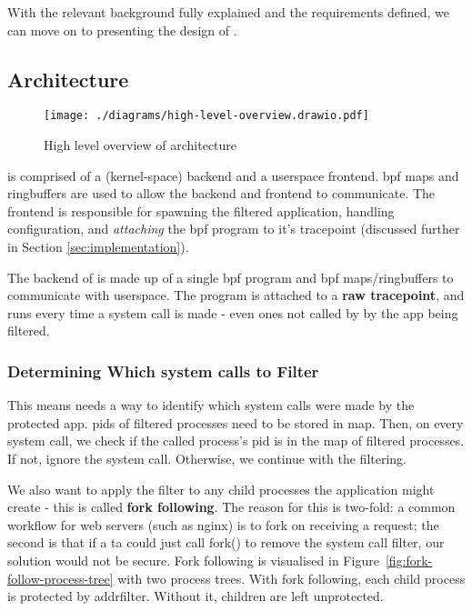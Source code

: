 With the relevant background fully explained and the requirements defined, we
can move on to presenting the design of \afss.~ 

\subsection{Architecture} \label{subsec:arch}

\begin{figure}[ht]
    \centering
    \texttt{[image: ./diagrams/high-level-overview.drawio.pdf]} 
    \caption{High level overview of \afg architecture}
    \label{fig:arch-overview}
\end{figure}

\af is comprised of a (kernel-space) backend and a userspace frontend.
\ac{bpf} maps and ringbuffers are used to allow the backend and frontend to
communicate. The frontend is responsible for spawning the filtered application,
handling configuration, and \textit{attaching} the \ac{bpf} program to it's
tracepoint (discussed further in Section \ref{sec:implementation}).

The backend of \af is made up of a single \ac{bpf} program and \ac{bpf}
maps/ringbuffers to communicate with userspace.
The program is attached to a \textbf{raw tracepoint}, and runs every time
a system call is made - even ones not called by by the app being filtered.

\subsubsection{Determining Which system calls to
Filter}\label{subsec:design-fork-following}

This means \af needs a way to identify which system calls were made by the
protected app. \acp{pid} of filtered processes
need to be stored in  map. Then, on every system call, we check if the
called process's \ac{pid} is in the map of filtered processes. If not, ignore
the system call. Otherwise, we continue with the filtering.

We also want to apply the filter to any child processes the
application might create - this is called \textbf{fork following}. The reason for this is two-fold: a common workflow for
web servers (such as nginx) \cite{apache-prefork-2.4, nginx-inside-performance-scale-2015} is to fork on receiving a request; the second is
that if a \ac{ta} could just call fork() to remove the system call filter, our
solution would not be secure. Fork following is visualised in
Figure~\ref{fig:fork-follow-process-tree} with two process trees. With fork
following, each child process is protected by addrfilter. Without it, children
are left unprotected.

